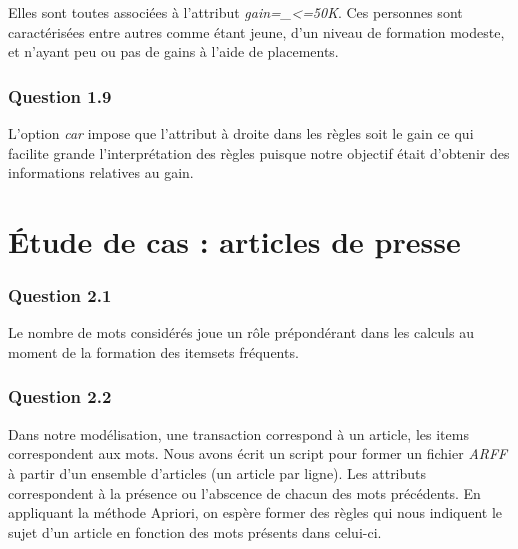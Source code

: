 \documentclass[a4paper,12pt]{article}
\begin{document}
Elles sont toutes associées à l'attribut \textit{gain=_<=50K}.
Ces personnes sont caractérisées entre autres comme étant jeune, d'un niveau de formation modeste, et n'ayant peu ou pas de gains à l'aide de placements.


\subsubsection{Question 1.9}

L'option \textit{car} impose que l'attribut à droite dans les règles soit le gain ce qui facilite grande l'interprétation des règles puisque notre objectif était d'obtenir des informations relatives au gain.



\section{\'Etude de cas : articles de presse}

\subsubsection*{Question 2.1}

Le nombre de mots considérés joue un rôle prépondérant dans les calculs au moment de la formation des itemsets fréquents.


\subsubsection*{Question 2.2}

Dans notre modélisation, une transaction correspond à un article, les items correspondent aux mots.
Nous avons écrit un script pour former un fichier \textit{ARFF} à partir d'un ensemble d'articles (un article par ligne).
Les attributs correspondent à la présence ou l'abscence de chacun des mots précédents.
En appliquant la méthode Apriori, on espère former des règles qui nous indiquent le sujet d'un article en fonction des mots présents dans celui-ci.
\end{document}
